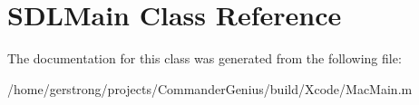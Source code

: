 \hypertarget{interface_s_d_l_main}{
\section{SDLMain Class Reference}
\label{interface_s_d_l_main}
}


The documentation for this class was generated from the following file:\begin{DoxyCompactItemize}
\item 
/home/gerstrong/projects/CommanderGenius/build/Xcode/MacMain.m\end{DoxyCompactItemize}
